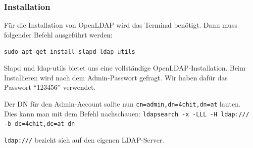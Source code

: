 \subsubsection{Installation}
Für die Installation von OpenLDAP wird das Terminal benötigt. Dann muss folgender Befehl ausgeführt werden:

\verb|sudo apt-get install slapd ldap-utils|

Slapd und ldap-utils bietet uns eine vollständige OpenLDAP-Installation. Beim Installieren wird nach dem Admin-Passwort gefragt. Wir haben dafür das Passwort ``123456'' verwendet.

Der DN für den Admin-Account sollte nun \verb|cn=admin,dn=4chit,dn=at| lauten.
Dies kann man mit dem Befehl nachschauen:
\verb|ldapsearch -x -LLL -H ldap:/// -b dc=4chit,dc=at dn|

\verb|ldap:///| bezieht sich auf den eigenen LDAP-Server.
